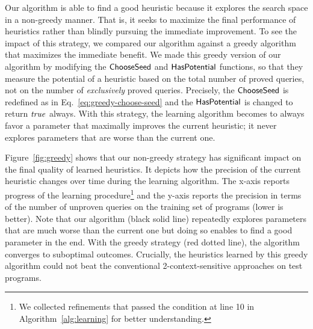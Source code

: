 
Our algorithm is able to find a good heuristic because it explores the
search space in a non-greedy manner.
That is, it seeks to maximize
the final performance of heuristics rather than blindly pursuing the immediate improvement.
To see the impact of this strategy, we compared our algorithm against
a greedy algorithm that maximizes the immediate benefit.
We made this greedy version of our algorithm by modifying the
${\sf ChooseSeed}$ and ${\sf HasPotential}$ functions, so that they measure
the potential of a heuristic based on the total number of proved
queries, not on the number of
{\em exclusively} proved queries. Precisely, the ${\sf ChooseSeed}$ is redefined as in Eq.~\ref{eq:greedy-choose-seed} and the ${\sf HasPotential}$ is changed to return ${\it true}$ always.
With this strategy, the learning algorithm becomes to always favor
a parameter that maximally improves the current heuristic; it never
explores parameters that are worse than the current one.

Figure~\ref{fig:greedy} shows that our non-greedy strategy has
significant impact on the final quality of learned heuristics.
It depicts how the precision of the current
heuristic changes over time during the learning
algorithm.  The x-axis reports progress of the learning procedure\footnote{We collected refinements that passed the condition at line 10 in Algorithm~\ref{alg:learning} for better understanding.} and
the y-axis reports the precision in terms of the number of unproven 
queries on the training set of programs (lower is better). Note that
our algorithm (black solid line) repeatedly explores parameters that
are much worse than the current one but doing so enables to find a good
parameter in the end. With the greedy strategy (red dotted line), the
algorithm converges to suboptimal outcomes. Crucially, the heuristics
learned by this greedy algorithm could not beat the conventional
2-context-sensitive approaches on test programs. 

